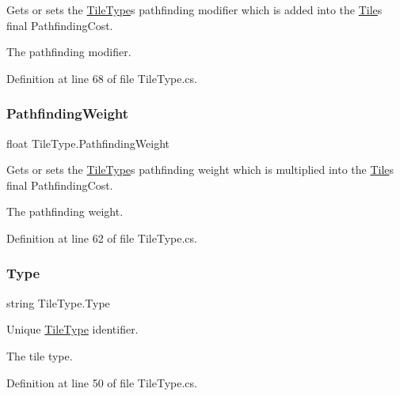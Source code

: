 Gets or sets the \hyperlink{class_tile_type}{Tile\+Type}\textquotesingle{}s pathfinding modifier which is added into the \hyperlink{class_tile}{Tile}\textquotesingle{}s final Pathfinding\+Cost. 

The pathfinding modifier.

Definition at line 68 of file Tile\+Type.\+cs.

\mbox{\label{class_tile_type_a51128d6ebf05eb04f7187ca86b181846}} 
\subsubsection{\texorpdfstring{Pathfinding\+Weight}{PathfindingWeight}}
{\footnotesize\ttfamily float Tile\+Type.\+Pathfinding\+Weight\hspace{0.3cm}{\ttfamily [get]}}



Gets or sets the \hyperlink{class_tile_type}{Tile\+Type}\textquotesingle{}s pathfinding weight which is multiplied into the \hyperlink{class_tile}{Tile}\textquotesingle{}s final Pathfinding\+Cost. 

The pathfinding weight.

Definition at line 62 of file Tile\+Type.\+cs.

\mbox{\label{class_tile_type_ade3d6ab90410efe24493eed09f5a8d21}} 
\subsubsection{\texorpdfstring{Type}{Type}}
{\footnotesize\ttfamily string Tile\+Type.\+Type\hspace{0.3cm}{\ttfamily [get]}}



Unique \hyperlink{class_tile_type}{Tile\+Type} identifier. 

The tile type.

Definition at line 50 of file Tile\+Type.\+cs.

\mbox{\label{class_tile_type_afb617b11992631ba7862acacbd5daee2}} 
